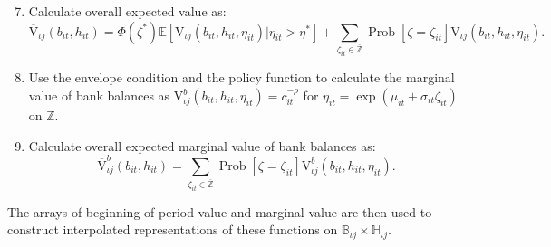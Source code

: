 \documentclass[12pt,pdftex,letterpaper]{article}
\newcommand{\Prob}{\operatorname{Prob}}
\newcommand{\E}{\mathbb{E}}
\newcommand{\Type}{\iota}
\newcommand{\Health}{h}
\newcommand{\Value}{\text{V}}
\newcommand{\Con}{c}
\newcommand{\Bank}{b}
\newcommand{\CRRAcon}{\rho}
\newcommand{\Age}{j}
\newcommand{\MedShk}{\eta}
\begin{document}
\begin{enumerate}
\setcounter{enumi}{6}

\item Calculate overall expected value as:
\begin{equation}
\overline{\Value}_{\Type \Age}(\Bank_{it},\Health_{it}) = \Phi(\zeta^*) \E [\Value_{\Type \Age}(\Bank_{it},\Health_{it},\MedShk_{it}) | \MedShk_{it} > \MedShk^* ] + \sum_{\zeta_{it} \in \overline{\mathbb{Z}}} \Prob[\zeta = \zeta_{it}] \Value_{\Type \Age}(\Bank_{it},\Health_{it},\MedShk_{it}).
\end{equation}

\item Use the envelope condition and the policy function to calculate the marginal value of bank balances as $\Value_{\Type \Age}^\Bank(\Bank_{it},\Health_{it},\MedShk_{it}) = \Con_{it}^{-\CRRAcon}$ for $\MedShk_{it} = \exp(\mu_{it} + \sigma_{it}\zeta_{it})$ on $\overline{\mathbb{Z}}$.

\item Calculate overall expected marginal value of bank balances as:
\begin{equation}
\overline{\Value}^\Bank_{\Type \Age}(\Bank_{it},\Health_{it}) = \sum_{\zeta_{it} \in \overline{\mathbb{Z}}} \Prob[\zeta = \zeta_{it}] \Value_{\Type \Age}^\Bank(\Bank_{it},\Health_{it},\MedShk_{it}).
\end{equation}
\end{enumerate}
The arrays of beginning-of-period value and marginal value are then used to construct interpolated representations of these functions on $\mathbb{B}_{\Type \Age} \times \mathbb{H}_{\Type \Age}$.
\end{document}
